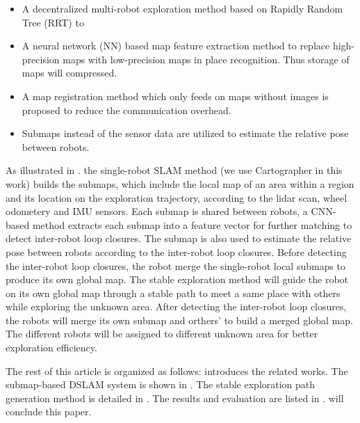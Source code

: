 \begin{itemize}
    \item A decentralized multi-robot exploration method based on Rapidly Random Tree (RRT) to 
    \item A neural network (NN) based map feature extraction method to replace high-precision maps with low-precision maps in place recognition. Thus storage of maps will compressed.
    \item A map registration method which only feeds on maps without images is proposed to reduce the communication overhead.
    \item Submaps instead of the sensor data are utilized to estimate the relative pose between robots.
\end{itemize}

As illustrated in . the single-robot SLAM method (we use Cartographer \cite{hess2016real} in this work) builds the submaps, which include the local map of an area within a region and its location on the exploration trajectory, according to the lidar scan, wheel odometery and IMU sensors.
Each submap is shared between robots, a CNN-based method extracts each submap into a feature vector for further matching to detect inter-robot loop closures.
The submap is also used to estimate the relative pose between robots according to the inter-robot loop closures.
Before detecting the inter-robot loop closures, the robot merge the single-robot local submaps to produce its own global map. 
The stable exploration method will guide the robot on its own global map through a stable path to meet a same place with others while exploring the unknown area.
After detecting the inter-robot loop closures, the robots will merge its own submap and orthers' to build a merged global map. The different robots will be assigned to different unknown area for better exploration efficiency.


The rest of this article is organized as follows:  introduces the related works. The submap-based DSLAM system is shown in . The stable exploration path generation method is detailed in . The results and evaluation are listed in .  will conclude this paper.